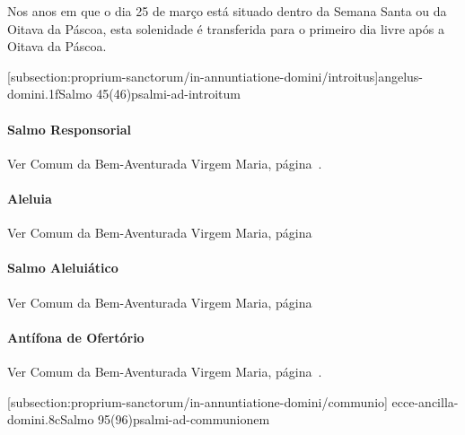 \def\Prefix{subsection:proprium-sanctorum/in-annuntiatione-domini}

\begin{rubrica}
  Nos anos em que o dia 25 de março está situado dentro da Semana Santa ou da Oitava da Páscoa, esta solenidade é transferida para o primeiro dia livre após a Oitava da Páscoa.
\end{rubrica}

[\Prefix/introitus]{angelus-domini.1f}{Salmo 45(46)}{psalmi-ad-introitum}

\paragraph{Salmo Responsorial}
\begin{rubrica}
  Ver Comum da Bem-Aventurada Virgem Maria, página~\pageref{subsection:communia/commune-bmv/psalmus-responsorius}.
\end{rubrica}

\paragraph{Aleluia}
\begin{rubrica}
  Ver Comum da Bem-Aventurada Virgem Maria, página~\pageref{subsection:communia/commune-bmv/alleluia}
\end{rubrica}

\paragraph{Salmo Aleluiático}
\begin{rubrica}
  Ver Comum da Bem-Aventurada Virgem Maria, página~\pageref{subsection:communia/commune-bmv/psalmus-alleluiaticus}
\end{rubrica}

\paragraph{Antífona de Ofertório}
\begin{rubrica}
  Ver Comum da Bem-Aventurada Virgem Maria, página~\pageref{subsection:communia/commune-bmv/offertorium}.
\end{rubrica}

\AllowPageFlush

[\Prefix/communio]
{ecce-ancilla-domini.8c}{Salmo 95(96)}{psalmi-ad-communionem}

\AllowPageFlush